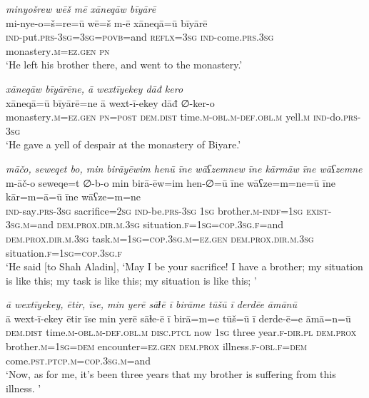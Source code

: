 \ea \label{DG.32}
\textit{minyošrew wēš mē xāneqāw bīyārē} \\ 
\gll mi-nye-o=š=re=ū wē=š m-ē xāneqā=ū bīyārē \\ 
 \textsc{ind-}put\textsc{.prs}\textsc{-3sg}\textsc{=3sg}\textsc{=\textsc{povb}}=and \textsc{reflx}\textsc{=3sg} \textsc{ind-}come\textsc{.prs}\textsc{.3sg} monastery\textsc{.m}\textsc{=ez}\textsc{.gen} \textsc{pn} \\ 
\glt `He left his brother there, and went to the monastery.'
\z 
 
\ea \label{DG.33}
\textit{xāneqāw bīyārēne, ā wextīyekey dāđ kero} \\ 
\gll xāneqā=ū bīyārē=ne ā wext-ī-ekey dāđ ∅-ker-o \\ 
 monastery\textsc{.m}\textsc{=ez}\textsc{.gen} \textsc{pn}\textsc{=\textsc{post}} \textsc{dem.dist} time\textsc{.m}\textsc{-obl}\textsc{.m}\textsc{-def}\textsc{.obl}\textsc{.m} yell\textsc{.m} \textsc{ind-}do\textsc{.prs}\textsc{-3sg} \\ 
\glt `He gave a yell of despair at the monastery of Biyare.'
\z 
 
\ea \label{DG.34}
\textit{māčo, seweqet bo, min birāyēwim henū īne wāʕzemnew īne kārmāw īne wāʕzemne} \\ 
\gll m-āč-o seweqe=t ∅-b-o min birā-ēw=im hen-∅=ū īne wāʕze=m=ne=ū īne kār=m=ā=ū īne wāʕze=m=ne \\ 
 \textsc{ind-}say\textsc{.prs}\textsc{-3sg} sacrifice\textsc{=\textsc{2sg}} \textsc{ind-}be\textsc{.prs}\textsc{-3sg} \textsc{1sg} brother\textsc{.m}\textsc{-indf}\textsc{=1sg} \textsc{exist}\textsc{-3sg}\textsc{.m}=and \textsc{dem.prox}\textsc{.dir}\textsc{.m}\textsc{.3sg} situation\textsc{\textsc{.f}}\textsc{=1sg}\textsc{=\textsc{cop.3sg\textsc{.f}}}=and \textsc{dem.prox}\textsc{.dir}\textsc{.m}\textsc{.3sg} task\textsc{.m}\textsc{=1sg}\textsc{=cop}\textsc{.3sg}\textsc{.m}\textsc{=ez}\textsc{.gen} \textsc{dem.prox}\textsc{.dir}\textsc{.m}\textsc{.3sg} situation\textsc{\textsc{.f}}\textsc{=1sg}\textsc{=\textsc{cop.3sg\textsc{.f}}} \\ 
\glt `He said [to Shah Aladin], ‘May I be your sacrifice! I have a brother; my situation is like this; my task is like this; my situation is like this; '
\z 
 
\ea \label{DG.38}
\textit{ā wextīyekey, ētir, īse, min yerē sāɫē ī birāme tūšū ī derdēe āmānū} \\ 
\gll ā wext-ī-ekey ētir īse min yerē sāɫe-ē ī birā=m=e tūš=ū ī derde-ē=e āmā=n=ū \\ 
 \textsc{dem.dist} time\textsc{.m}\textsc{-obl}\textsc{.m}\textsc{-def}\textsc{.obl}\textsc{.m} \textsc{disc.ptcl} now \textsc{1sg} three year\textsc{\textsc{.f}}\textsc{-dir}\textsc{.pl} \textsc{dem.prox} brother\textsc{.m}\textsc{=1sg}\textsc{=dem} encounter\textsc{=ez}\textsc{.gen} \textsc{dem.prox} illness\textsc{\textsc{.f}}\textsc{-obl}\textsc{\textsc{.f}}\textsc{=dem} come\textsc{.pst}\textsc{.ptcp}\textsc{.m}\textsc{=cop}\textsc{.3sg}\textsc{.m}=and \\ 
\glt `Now, as for me, it’s been three years that my brother is suffering from this illness. '
\z 
 
